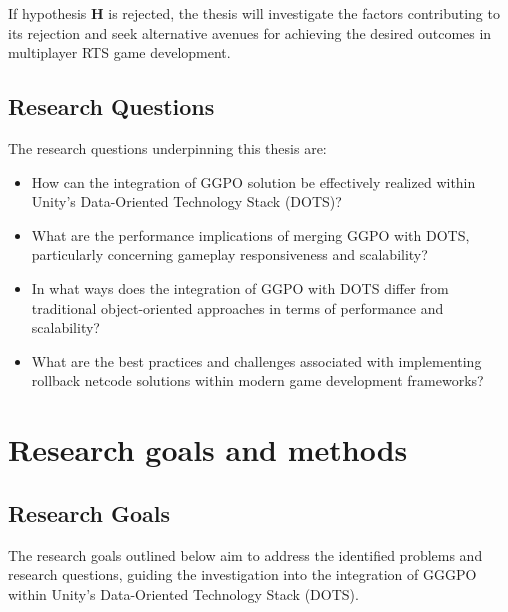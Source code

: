 If hypothesis \textbf{H} is rejected, the thesis will investigate the factors contributing to its rejection and seek alternative avenues for achieving the desired outcomes in multiplayer RTS game development.

\subsection{Research Questions}

The research questions underpinning this thesis are:

\begin{itemize}
\item How can the integration of GGPO solution be effectively realized within Unity's Data-Oriented Technology Stack (DOTS)?
\item What are the performance implications of merging GGPO with DOTS, particularly concerning gameplay responsiveness and scalability?
\item In what ways does the integration of GGPO with DOTS differ from traditional object-oriented approaches in terms of performance and scalability?
\item What are the best practices and challenges associated with implementing rollback netcode solutions within modern game development frameworks?
\end{itemize}


\section{Research goals and methods}

\subsection{Research Goals}

The research goals outlined below aim to address the identified problems and research questions, guiding the investigation into the integration of GGGPO within Unity's Data-Oriented Technology Stack (DOTS).

